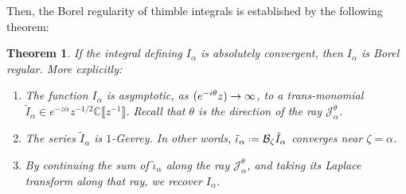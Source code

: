 \documentclass{article}
\let\Re\relax
\DeclareMathOperator{\Re}{Re}
\newcommand{\C}{\mathbb{C}}
\newcommand{\fracderiv}[3]{\partial^{#1}_{#2, #3}}
\newcommand*{\defeq}{\mathrel{\vcenter{\baselineskip0.5ex \lineskiplimit0pt
                     \hbox{\scriptsize.}\hbox{\scriptsize.}}}%
                     =}
\newcommand{\borel}{\mathcal{B}}
\theoremstyle{definition}
\theoremstyle{plain}
\newtheorem{theorem}{Theorem}[section]
\begin{document}
Then, the Borel regularity of thimble integrals is established by the following theorem: 
\begin{theorem}\label{thm:maxim}
If the integral defining $I_\alpha$ is absolutely convergent, then $I_\alpha$ is Borel regular. More explicitly: 
\begin{enumerate}
\item\label{part-1} The function $I_\alpha$ is asymptotic, as $\Re (e^{-i\theta} z) \to \infty$, to a trans-monomial $\tilde{I}_\alpha\in e^{-z \alpha} z^{-1/2} \C\llbracket z^{-1}\rrbracket$. Recall that $\theta$ is the direction of the ray $\mathcal{J}^\theta_\alpha$.
\item\label{part-2} The series $\tilde{I}_\alpha$ is $1$-Gevrey. In other words, $\tilde{\iota}_\alpha \defeq \borel_\zeta \tilde{I}_\alpha$ converges near $\zeta=\alpha$.
\item\label{part-3} By continuing the sum of $\tilde{\iota}_\alpha$ along the ray $\mathcal{J}_\alpha^\theta$, and taking its Laplace transform along that ray, we recover $I_\alpha$.
\end{enumerate}
\end{theorem}
\end{document}
